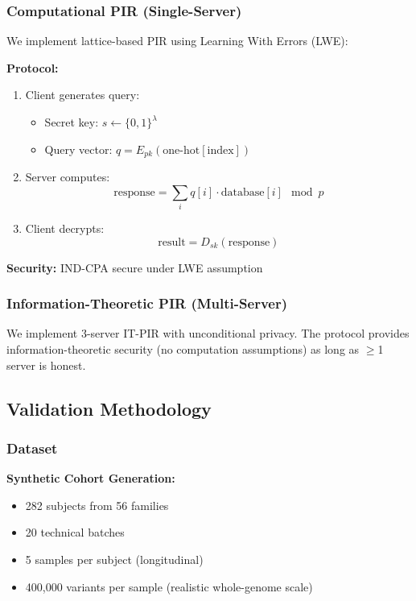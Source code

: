 \documentclass[11pt,a4paper]{article}
\begin{document}
\subsubsection{Computational PIR (Single-Server)}

We implement lattice-based PIR using Learning With Errors (LWE):

\textbf{Protocol:}
\begin{enumerate}
    \item Client generates query:
    \begin{itemize}
        \item Secret key: $s \leftarrow \{0,1\}^\lambda$
        \item Query vector: $q = E_{pk}(\text{one-hot}[\text{index}])$
    \end{itemize}

    \item Server computes:
    \begin{equation}
        \text{response} = \sum_i q[i] \cdot \text{database}[i] \mod p
    \end{equation}

    \item Client decrypts:
    \begin{equation}
        \text{result} = D_{sk}(\text{response})
    \end{equation}
\end{enumerate}

\textbf{Security:} IND-CPA secure under LWE assumption \cite{regev2009lattices}

\subsubsection{Information-Theoretic PIR (Multi-Server)}

We implement 3-server IT-PIR with unconditional privacy. The protocol provides information-theoretic security (no computation assumptions) as long as $\geq$1 server is honest.

\subsection{Validation Methodology}

\subsubsection{Dataset}

\textbf{Synthetic Cohort Generation:}
\begin{itemize}
    \item 282 subjects from 56 families
    \item 20 technical batches
    \item 5 samples per subject (longitudinal)
    \item 400,000 variants per sample (realistic whole-genome scale)
\end{itemize}
\end{document}
